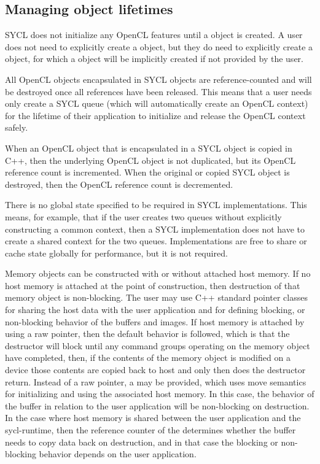 \subsection{Managing object lifetimes}
\label{sec:managing-object-lifetimes}

SYCL does not initialize any OpenCL features until a
 object is created. A user does not need to
explicitly create a  object, but they do need to
explicitly create a  object, for which a
 object will be implicitly created if not provided
by the user.

All OpenCL objects encapsulated in SYCL objects are reference-counted and will
be destroyed once all references have been released. This means that a user needs
only create a SYCL queue (which will automatically create an OpenCL context) for
the lifetime of their application to initialize and release the OpenCL context
safely.

When an OpenCL object that is encapsulated in a SYCL object is copied in C++,
then the underlying OpenCL object is not duplicated, but its OpenCL reference
count is incremented. When the original or copied SYCL object is destroyed, then
the OpenCL reference count is decremented.

There is no global state specified to be required in SYCL implementations. This
means, for example, that if the user creates two queues without explicitly
constructing a common context, then a SYCL implementation does not have to
create a shared context for the two queues. Implementations are free to share or
cache state globally for performance, but it is not required.

Memory objects can be constructed with or without attached host memory. If no
host memory is attached at the point of construction, then destruction of that
memory object is non-blocking. The user may use C++ standard pointer classes
for sharing the host data with the user application and for defining blocking,
or non-blocking behavior of the buffers and images.
If host memory is attached by using a raw pointer,  then the default behavior is
followed, which is that the destructor will block until any command groups
operating on the memory object have completed, then, if the contents of the
memory object is modified on a device those contents are copied back to host and
only then does the destructor return. Instead of a raw pointer, a
 may be provided, which uses move semantics for initializing
and using the associated host memory. In this case, the behavior of the buffer
in relation to the user application
will be non-blocking on destruction. In the case where host memory is shared
between the user application and the \gls{sycl-runtime}, then the reference counter
of the  determines whether the buffer needs to copy
data back on destruction, and in that case the blocking or non-blocking behavior
depends on the user application.


